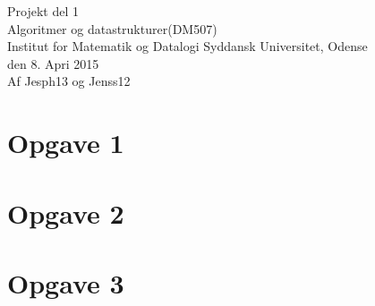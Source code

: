 \documentclass{article}
\begin{document}
{\centering 
\huge
Projekt del 1\\
Algoritmer og datastrukturer(DM507)\\
\large
\bigskip
Institut for Matematik og Datalogi Syddansk Universitet, Odense\\
\bigskip
den 8. Apri 2015\\
\bigskip
Af Jesph13 og Jenss12\\
}
\newpage
\section*{Opgave 1}
\newpage
\section*{Opgave 2}
\newpage
\section*{Opgave 3}
\end{document}
